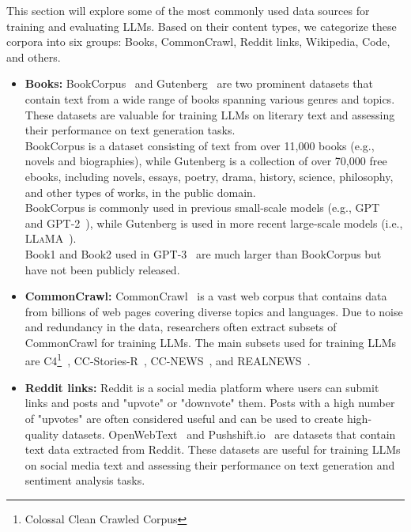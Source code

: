 This section will explore some of the most commonly used data sources for training and evaluating LLMs.
Based on their content types, we categorize these corpora into six groups: Books, CommonCrawl, Reddit links, Wikipedia, Code, and others.

\begin{itemize}
	\item \textbf{Books:} {
		      BookCorpus~\cite{zhu2015aligning} and Gutenberg~\cite{projectgutenberg} are two prominent datasets that contain text from a wide range of books spanning various genres and topics. These datasets are valuable for training LLMs on literary text and assessing their performance on text generation tasks.\\
		      BookCorpus is a dataset consisting of text from over 11,000 books (e.g., novels and biographies), while Gutenberg is a collection of over 70,000 free ebooks, including novels, essays, poetry, drama, history, science, philosophy, and other types of works, in the public domain.\\
		      BookCorpus is commonly used in previous small-scale models (e.g., GPT~\cite{radford2018improving} and GPT-2~\cite{radford2019language}), while Gutenberg is used in more recent large-scale models (i.e., \textsc{LLaMA}~\cite{touvron2023llama}).\\
		      Book1 and Book2 used in GPT-3~\cite{brown2020language} are much larger than BookCorpus but have not been publicly released.
	      }
	\item \textbf{CommonCrawl:} {
		      CommonCrawl~\cite{commoncrawl} is a vast web corpus that contains data from billions of web pages covering diverse topics and languages. Due to noise and redundancy in the data, researchers often extract subsets of CommonCrawl for training LLMs. The main subsets used for training LLMs are C4\footnote{Colossal Clean Crawled Corpus}~\cite{raffel2023exploring}, CC-Stories-R~\cite{trinh2018simple}, CC-NEWS~\cite{liu2019roberta}, and REALNEWS~\cite{zellers2019defending}.\\
	      }
	\item \textbf{Reddit links:} {
		      Reddit is a social media platform where users can submit links and posts and "upvote" or "downvote" them. Posts with a high number of "upvotes" are often considered useful and can be used to create high-quality datasets.
		      OpenWebText~\cite{gokaslan2019openwebtext} and Pushshift.io~\cite{baumgartner2020pushshift} are datasets that contain text data extracted from Reddit. These datasets are useful for training LLMs on social media text and assessing their performance on text generation and sentiment analysis tasks.
}
\end{itemize}
